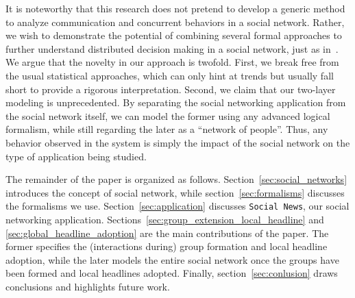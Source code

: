 It is noteworthy that this research does not pretend to develop a generic method to analyze communication and concurrent
behaviors in a social network. Rather, we wish to demonstrate the potential of combining several formal approaches to
further understand distributed decision making in a social network, just as in~\cite{He-Yuan-Zeng:07}. We argue that the
novelty in our approach is twofold. First, we break free from the usual statistical approaches, which can only hint at
trends but usually fall short to provide a rigorous interpretation. Second, we claim that our two-layer modeling is
unprecedented. By separating the social networking application from the social network itself, we can model the former
using any advanced logical formalism, while still regarding the later as a ``network of people''. Thus, any behavior
observed in the system is simply the impact of the social network on the type of application being studied.

The remainder of the paper is organized as follows. Section~\ref{sec:social_networks} introduces the concept of social network,
while section~\ref{sec:formalisms} discusses the formalisms we use. Section~\ref{sec:application} discusses {\tt Social News},
our social networking application. Sections~\ref{sec:group_extension_local_headline} and \ref{sec:global_headline_adoption} are the main contributions of
the paper. The former specifies the (interactions during) group formation and local headline adoption, while the later
models the entire social network once the groups have been formed and local headlines adopted. Finally,
section~\ref{sec:conlusion} draws conclusions and highlights future work.

